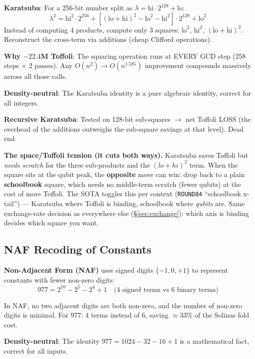 \documentclass[11pt,a4paper]{article}
\begin{document}
\textbf{Karatsuba}: For a 256-bit number split as $\lambda = \text{hi} \cdot 2^{128} + \text{lo}$:
\[
  \lambda^2 = \text{hi}^2 \cdot 2^{256}
            + \left[(\text{lo}+\text{hi})^2 - \text{lo}^2 - \text{hi}^2\right] \cdot 2^{128}
            + \text{lo}^2
\]
Instead of computing 4 products, compute only 3 squares: $\text{lo}^2$, $\text{hi}^2$,
$(\text{lo}+\text{hi})^2$. Reconstruct the cross-term via additions (cheap Clifford operations).

\textbf{Why $-22.4$M Toffoli}: The squaring operation runs at EVERY GCD step (258 steps $\times$
2 passes). Any $O(n^2) \to O(n^{1.585})$ improvement compounds massively across all those calls.

\textbf{Density-neutral}: The Karatsuba identity is a pure algebraic identity, correct for all
integers.

\textbf{Recursive Karatsuba}: Tested on 128-bit sub-squares $\to$ net Toffoli LOSS (the overhead
of the additions outweighs the sub-square savings at that level). Dead end.

\textbf{The space/Toffoli tension (it cuts both ways).} Karatsuba saves Toffoli but \emph{needs
scratch} for the three sub-products and the $(lo+hi)^2$ term. When the square sits at the qubit peak,
the \textbf{opposite} move can win: drop back to a plain \textbf{schoolbook} square, which needs no
middle-term scratch (fewer qubits) at the cost of more Toffoli. The SOTA toggles this per context
(\texttt{ROUND84} ``schoolbook x-tail'') --- Karatsuba where Toffoli is binding, schoolbook where
\emph{qubits} are. Same exchange-rate decision as everywhere else (\S\ref{sec:exchange}): which axis
is binding decides which square you want.

\subsection{NAF Recoding of Constants}

\textbf{Non-Adjacent Form (NAF)} uses signed digits $\{-1, 0, +1\}$ to represent constants with
fewer non-zero digits:
\[
  977 = 2^{10} - 2^{5} - 2^{4} + 1 \quad \text{(4 signed terms vs 6 binary terms)}
\]

In NAF, no two adjacent digits are both non-zero, and the number of non-zero digits is minimal.
For $977$: 4 terms instead of 6, saving $\approx33\%$ of the Solinas fold cost.

\textbf{Density-neutral}: The identity $977 = 1024 - 32 - 16 + 1$ is a mathematical fact, correct
for all inputs.
\end{document}
